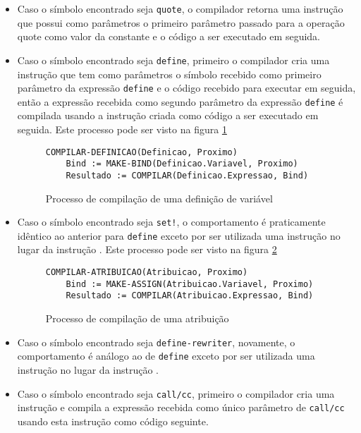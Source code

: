 \begin{itemize}
\begin{itemize}
 \item Caso o símbolo encontrado seja \texttt{quote}, o compilador retorna uma
 instrução  que possui como parâmetros o primeiro parâmetro 
 passado para a operação quote como valor da constante e o código a ser
 executado em seguida.
 
 \item Caso o símbolo encontrado seja \texttt{define}, primeiro o compilador
 cria uma instrução  que tem como parâmetros o símbolo recebido como
 primeiro parâmetro da expressão \texttt{define} e o código recebido para
 executar em seguida, então a expressão recebida como segundo parâmetro da
 expressão \texttt{define} é compilada usando a instrução  criada
 como código a ser executado em seguida. Este processo pode ser visto na figura
 \ref{fig:compile-define}
 
\begin{figure}
\begin{lstlisting}
COMPILAR-DEFINICAO(Definicao, Proximo)
    Bind := MAKE-BIND(Definicao.Variavel, Proximo)
    Resultado := COMPILAR(Definicao.Expressao, Bind)
\end{lstlisting}
\caption{Processo de compilação de uma definição de variável}
\label{fig:compile-define}
\end{figure}

 \item Caso o símbolo encontrado seja \texttt{set!}, o comportamento é
 praticamente idêntico ao anterior para \texttt{define} exceto por ser utilizada
 uma instrução  no lugar da instrução . Este processo
 pode ser visto na figura \ref{fig:compile-assign}
 
\begin{figure}
\begin{lstlisting}
COMPILAR-ATRIBUICAO(Atribuicao, Proximo)
    Bind := MAKE-ASSIGN(Atribuicao.Variavel, Proximo)
    Resultado := COMPILAR(Atribuicao.Expressao, Bind)
\end{lstlisting}
\caption{Processo de compilação de uma atribuição}
\label{fig:compile-assign}
\end{figure}

 \item Caso o símbolo encontrado seja \texttt{define-rewriter}, novamente,
 o comportamento é análogo ao de \texttt{define} exceto por ser utilizada uma
 instrução  no lugar da instrução .
 
 \item Caso o símbolo encontrado seja \texttt{call/cc}, primeiro o compilador 
 cria uma instrução  e compila a expressão recebida como único 
 parâmetro de \texttt{call/cc} usando esta instrução  como código
 seguinte. 
 

\end{itemize}
\end{itemize}
